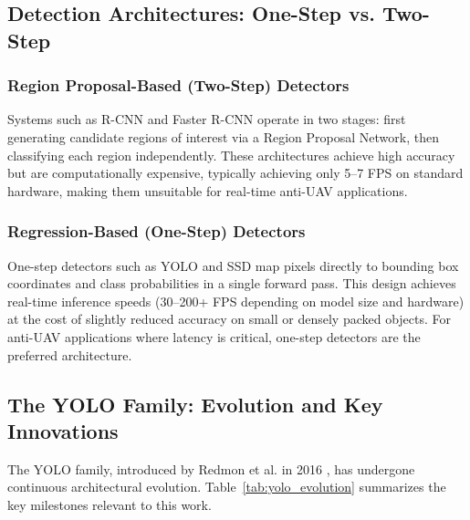 \documentclass[12pt,a4paper]{report}
\begin{document}
\subsection{Detection Architectures: One-Step vs. Two-Step}

\subsubsection{Region Proposal-Based (Two-Step) Detectors}

Systems such as R-CNN \cite{girshick2014rcnn} and Faster R-CNN \cite{ren2015fasterrcnn}
operate in two stages: first generating candidate regions of interest via a Region
Proposal Network, then classifying each region independently. These architectures
achieve high accuracy but are computationally expensive, typically achieving only
5--7 FPS on standard hardware, making them unsuitable for real-time anti-UAV
applications.

\subsubsection{Regression-Based (One-Step) Detectors}

One-step detectors such as YOLO \cite{redmon2016yolo} and SSD map pixels directly
to bounding box coordinates and class probabilities in a single forward pass.
This design achieves real-time inference speeds (30--200+ FPS depending on model
size and hardware) at the cost of slightly reduced accuracy on small or densely
packed objects. For anti-UAV applications where latency is critical, one-step
detectors are the preferred architecture.

\subsection{The YOLO Family: Evolution and Key Innovations}

The YOLO family, introduced by Redmon et al. in 2016 \cite{redmon2016yolo}, has
undergone continuous architectural evolution. Table~\ref{tab:yolo_evolution}
summarizes the key milestones relevant to this work.
\end{document}
